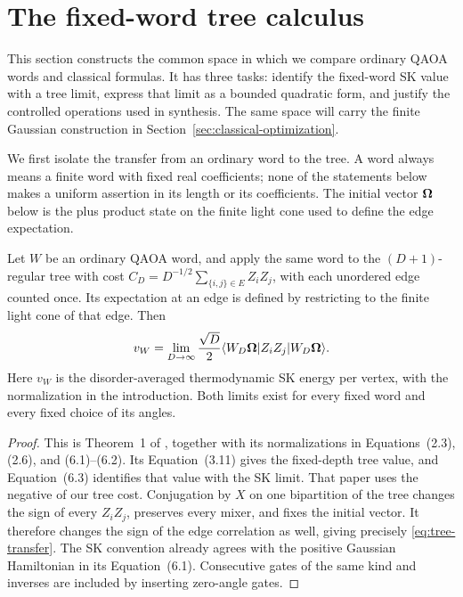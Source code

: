 \section{The fixed-word tree calculus}
\label{sec:foundations}

This section constructs the common space in which we compare ordinary
QAOA words and classical formulas.  It has three tasks: identify the
fixed-word SK value with a tree limit, express that limit as a bounded
quadratic form, and justify the controlled operations used in synthesis.
The same space will carry the finite Gaussian construction in
Section~\ref{sec:classical-optimization}.

We first isolate the transfer from an ordinary word to the tree.
A word always means a finite word with fixed real coefficients; none
of the statements below makes a uniform assertion in its length or
its coefficients. The initial vector $\boldsymbol\Omega$ below is the plus product
state on the finite light cone used to define the edge expectation.

\begin{proposition}\label{prop:tree-transfer}
Let $W$ be an ordinary QAOA word, and apply the same word to the
$(D+1)$-regular tree with cost
$C_D=D^{-1/2}\sum_{\{i,j\}\in E}Z_iZ_j$, with each unordered edge
counted once.  Its expectation at an edge is
defined by restricting to the finite light cone of that edge.  Then
\begin{equation}\label{eq:tree-transfer}
 v_W=\lim_{D\to\infty}\frac{\sqrt D}{2}
       \langle W_D\boldsymbol\Omega\rvert Z_iZ_j\lvert W_D\boldsymbol\Omega\rangle.
\end{equation}
Here $v_W$ is the disorder-averaged thermodynamic SK energy per vertex,
with the normalization in the introduction.  Both limits exist for
every fixed word and every fixed choice of its angles.
\end{proposition}

\begin{proof}
This is Theorem~1 of \cite{BFMVZ2022}, together with its
normalizations in Equations~(2.3), (2.6), and (6.1)--(6.2).
Its Equation~(3.11) gives the fixed-depth tree value, and
Equation~(6.3) identifies that value with the SK limit.
That paper uses the negative of our tree cost.
Conjugation by $X$ on one bipartition of the tree changes the
sign of every $Z_iZ_j$, preserves every mixer, and fixes the initial
vector.  It therefore changes the sign of the edge correlation as
well, giving precisely \eqref{eq:tree-transfer}.  The SK convention
already agrees with the positive Gaussian Hamiltonian in its
Equation~(6.1).  Consecutive gates of the same kind and inverses are
included by inserting zero-angle gates.
\end{proof}

